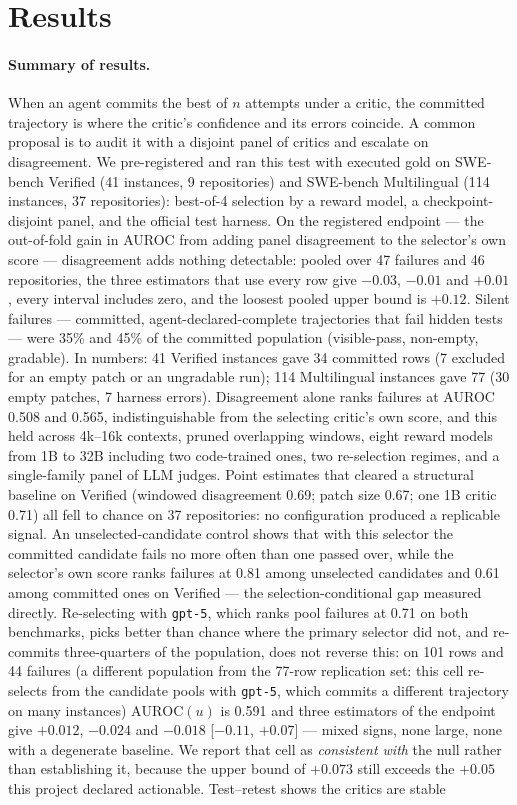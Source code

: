 \documentclass[11pt]{article}
\begin{document}
\section{Results}
\paragraph{Summary of results.} When an agent commits the best of $n$ attempts under a critic, the committed trajectory is where the critic's confidence and its errors coincide. A common proposal is to audit it with a disjoint panel of critics and escalate on disagreement. We pre-registered and ran this test with executed gold on SWE-bench Verified (41 instances, 9 repositories) and SWE-bench Multilingual (114 instances, 37 repositories): best-of-4 selection by a reward model, a checkpoint-disjoint panel, and the official test harness. On the registered endpoint --- the out-of-fold gain in AUROC from adding panel disagreement to the selector's own score --- disagreement adds nothing detectable: pooled over 47 failures and 46 repositories, the three estimators that use every row give $-0.03$, $-0.01$ and $+0.01$, every interval includes zero, and the loosest pooled upper bound is $+0.12$. Silent failures --- committed, agent-declared-complete trajectories that fail hidden tests --- were 35\% and 45\% of the committed population (visible-pass, non-empty, gradable). In numbers: 41 Verified instances gave 34 committed rows (7 excluded for an empty patch or an ungradable run); 114 Multilingual instances gave 77 (30 empty patches, 7 harness errors). Disagreement alone ranks failures at AUROC 0.508 and 0.565, indistinguishable from the selecting critic's own score, and this held across 4k--16k contexts, pruned overlapping windows, eight reward models from 1B to 32B including two code-trained ones, two re-selection regimes, and a single-family panel of LLM judges. Point estimates that cleared a structural baseline on Verified (windowed disagreement 0.69; patch size 0.67; one 1B critic 0.71) all fell to chance on 37 repositories: no configuration produced a replicable signal. An unselected-candidate control shows that with this selector the committed candidate fails no more often than one passed over, while the selector's own score ranks failures at 0.81 among unselected candidates and 0.61 among committed ones on Verified --- the selection-conditional gap measured directly. Re-selecting with \texttt{gpt-5}, which ranks pool failures at 0.71 on both benchmarks, picks better than chance where the primary selector did not, and re-commits three-quarters of the population, does not reverse this: on 101 rows and 44 failures (a different population from the 77-row replication set: this cell re-selects from the candidate pools with \texttt{gpt-5}, which commits a different trajectory on many instances) $\mathrm{AUROC}(u)$ is 0.591 and three estimators of the endpoint give $+0.012$, $-0.024$ and $-0.018$ [$-0.11$, $+0.07$] --- mixed signs, none large, none with a degenerate baseline. We report that cell as \emph{consistent with} the null rather than establishing it, because the upper bound of $+0.073$ still exceeds the $+0.05$ this project declared actionable. Test--retest shows the critics are stable 
\end{document}
